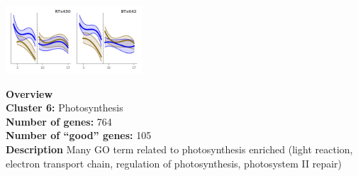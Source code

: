 \begin{multicols}{2}
\includegraphics[width=2in]{figures/clusters/leaf_Preflowering_5.png}
\columnbreak

\noindent \textbf{Overview}\\\textbf{Cluster 6:} Photosynthesis \\
\textbf{Number of genes:} 764 \\
\textbf{Number of ``good'' genes:} 105 \\
\textbf{Description} Many GO term related to photosynthesis enriched (light reaction, electron transport chain, regulation of photosynthesis, photosystem II repair) \\
\end{multicols}

